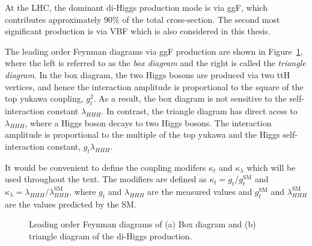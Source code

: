 At the LHC, the dominant di-Higgs production mode is via ggF, which contributes approximately 90\% of 
the total cross-section.
The second most significant production is via VBF which is also considered in this thesis.

The leading order Feynman diagrams via ggF production 
are shown in Figure~\ref{fig:SM:di-Higgs-ggf},
where the left is referred to as the \textit{box diagram} and the right is called the
\textit{triangle diagram}.
In the box diagram, the two Higgs bosons are produced via two
ttH vertices, and hence the interaction amplitude is proportional to the square of the top
yukawa coupling, $g_t^2$. 
As a result, the box diagram is not sensitive to the self-interaction constant $\lambda_{HHH}$. 
In contrast, the triangle diagram has direct acess to $\lambda_{HHH}$, 
where a Higgs boson decays to two Higgs bosons.
The interaction amplitude is proportional to the multiple of the top yukawa and the Higgs
self-interaction constant, $g_t\lambda_{HHH}$. 

It would be convenient to define the coupling modifers $\kappa_t$ and $\kappa_\lambda$
which will be used throughout the text. The modifiers are defined as 
$\kappa_t = g_t/g_t^{\text{SM}}$ and
$\kappa_\lambda =  \lambda_{HHH}/\lambda^{\text{SM}}_{HHH}$, where
$g_t$ and $\lambda_{HHH}$ are the measured values and $g_t^{\text{SM}}$ and
$\lambda^{\text{SM}}_{HHH}$ are the values predicted by the SM.


\begin{figure}[htbp]
\centering
{} \quad
{} \quad
\caption{Leading order Feynman diagrams of 
(a) Box diagram and (b) triangle diagram of the di-Higgs production.
}
\label{fig:SM:di-Higgs-ggf}
\end{figure}

